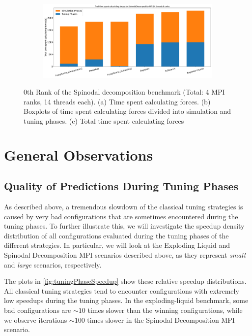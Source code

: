 \begin{figure}[H]
    \begin{subfigure}[b]{\textwidth}
        \includegraphics[width=\columnwidth,trim={0cm 0 0cm 0.9cm},clip]{figures/Benchmark/SpinodalDecompositionMPI/SpinodalDecompositionMPI_timings_total_SpinodalDecompositionMPI_14_0.png}
        \caption{}
        \label{fig:spinodalTotalTime_14thread}
    \end{subfigure}


    \caption[Spinodal decomposition benchmark MPI with 14 threads]{0th Rank of the Spinodal decomposition benchmark (Total: 4 MPI ranks, 14 threads each). (a) Time spent calculating forces. (b) Boxplots of time spent calculating forces divided into simulation and tuning phases. (c) Total time spent calculating forces}
    \label{fig:spinodal_14thread}
\end{figure}



\section{General Observations}

\subsection{Quality of Predictions During Tuning Phases}

As described above, a tremendous slowdown of the classical tuning strategies is caused by very bad configurations that are sometimes encountered during the tuning phases. To further illustrate this, we will investigate the speedup density distribution of all configurations evaluated during the tuning phases of the different strategies. In particular, we will look at the Exploding Liquid and Spinodal Decomposition MPI scenarios described above, as they represent \emph{small} and \emph{large} scenarios, respectively.

The plots in \autoref{fig:tuningPhaseSpeedup} show these relative speedup distributions. All classical tuning strategies tend to encounter configurations with extremely low speedups during the tuning phases. In the exploding-liquid benchmark, some bad configurations are $\sim10$ times slower than the winning configurations, while we observe iterations $\sim100$ times slower in the Spinodal Decomposition MPI scenario.

